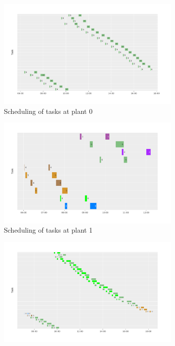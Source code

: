 \documentclass{article}
\begin{document}
\begin{figure}[htb]
    \centering
    \begin{subfigure}{0.5\textwidth}
        \includegraphics[width=\linewidth]{depot_0.pdf}
        \vspace*{-2em}
        \caption{Scheduling of tasks at plant 0}
        \label{fig:plant0}
    \end{subfigure}%
    \hfill%
    \begin{subfigure}{0.5\textwidth}
        \includegraphics[width=\linewidth]{depot_1.pdf}
        \vspace*{-2em}
        \caption{Scheduling of tasks at plant  1}
        \label{fig:plant1}
    \end{subfigure}
    \vspace*{-1mm}
    \begin{subfigure}{\textwidth}
        \includegraphics[width=\linewidth]{depot_2.pdf}

\end{subfigure}
\end{figure}
\end{document}
